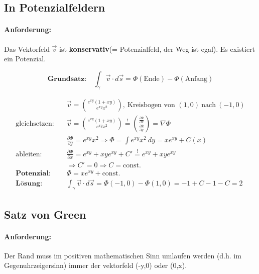 \documentclass[11pt]{article}
\begin{document}
\subsection{In Potenzialfeldern}

\paragraph{Anforderung:} Das Vektorfeld $\vec{v}$ ist \textbf{konservativ}(= Potenzialfeld, der Weg ist egal). Es existiert ein Potenzial.

\begin{equation*}
	\textbf{Grundsatz:}\quad\int_\gamma \vec{v} \cdot d\vec{s} = \Phi(\text{Ende}) - \Phi(\text{Anfang})
\end{equation*}

\begin{equation*}
\begin{split}
	& \vec{v} = \binom{e^{xy}(1 + xy)}{e^{xy}x^2},\ \text{Kreisbogen von } (1,0)\ \text{nach}\ (-1,0) \\
	\text{gleichsetzen:}\quad & \vec{v} = \binom{e^{xy}(1 + xy)}{e^{xy}x^2} \overset{!}{=} \binom{\frac{\partial\Phi}{\partial x}}{\frac{\partial\Phi}{\partial y}} = \nabla\Phi \\
	& \frac{\partial\Phi}{\partial y} = e^{xy}x^2 \Rightarrow \Phi = \int e^{xy}x^2\ dy = xe^{xy} + C(x) \\
	\text{ableiten:}\quad & \frac{\partial\Phi}{\partial x} = e^{xy} + xye^{xy} + C' \overset{!}{=} e^{xy} + xye^{xy} \\
	& \Rightarrow C' = 0 \Rightarrow C = \text{const.} \\
	\textbf{Potenzial:}\quad & \Phi = xe^{xy} + \text{const.} \\
	\textbf{L{\"o}sung:}\quad & \int_\gamma \vec{v} \cdot d\vec{s} = \Phi(-1,0) - \Phi(1,0) = -1 + C -1 - C = 2
\end{split}
\end{equation*}

\subsection{Satz von Green}

\paragraph{Anforderung:} Der Rand muss im positiven mathematischen Sinn umlaufen werden (d.h. im Gegenuhrzeigersinn) immer der vektorfeld (-y,0) oder (0,x).
\end{document}
